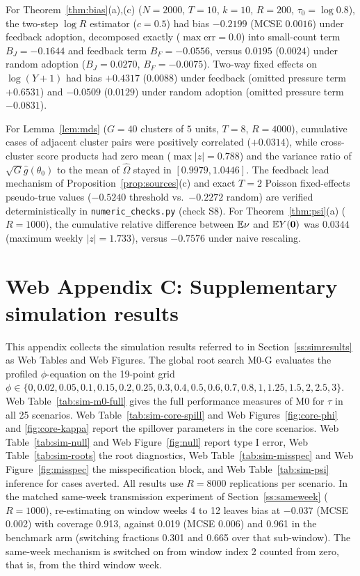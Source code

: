 For Theorem~\ref{thm:bias}(a),(c) ($N=2000$, $T=10$, $k=10$, $R=200$, $\tau_0=\log0.8$), the two-step $\log R$ estimator ($c=0.5$)
had bias $-0.2199$ (MCSE $0.0016$) under feedback adoption, decomposed exactly ($\max\text{err}=0.0$) into small-count term
$B_J=-0.1644$ and feedback term $B_F=-0.0556$, versus $0.0195$ ($0.0024$) under random adoption ($B_J=0.0270$, $B_F=-0.0075$).
Two-way fixed effects on $\log(Y+1)$ had bias $+0.4317$ ($0.0088$) under feedback (omitted pressure term $+0.6531$) and
$-0.0509$ ($0.0129$) under random adoption (omitted pressure term $-0.0831$).

For Lemma~\ref{lem:mds} ($G=40$ clusters of $5$ units, $T=8$, $R=4000$), cumulative cases of adjacent cluster pairs
were positively correlated ($+0.0314$), while cross-cluster score products had zero mean ($\max |z|=0.788$) and
the variance ratio of $\sqrt{G}\hat g(\theta_0)$ to the mean of $\hat\Omega$ stayed in $[0.9979, 1.0446]$. The feedback
lead mechanism of Proposition~\ref{prop:sources}(c) and exact $T=2$ Poisson fixed-effects pseudo-true values ($-0.5240$ threshold vs.\
$-0.2272$ random) are verified deterministically in \texttt{numeric\_checks.py} (check S8). For Theorem~\ref{thm:psi}(a)
($R=1000$), the cumulative relative difference between $\mathbb{E}\nu$ and $\mathbb{E} Y(\mathbf 0)$ was $0.0344$ (maximum weekly $|z|=1.733$),
versus $-0.7576$ under naive rescaling.

\section*{Web Appendix C: Supplementary simulation results}
\label{app:supp}
\webfloats

This appendix collects the simulation results referred to in Section~\ref{ss:simresults} as Web
Tables and Web Figures. The global root search M0-G evaluates the profiled $\phi$-equation on the
19-point grid
$\phi\in\{0,0.02,0.05,0.1,0.15,0.2,0.25,0.3,0.4,0.5,0.6,0.7,0.8,1,1.25,1.5,2,2.5,3\}$.
Web Table~\ref{tab:sim-m0-full} gives the full performance measures of M0
for $\tau$ in all 25 scenarios. Web Table~\ref{tab:sim-core-spill} and Web
Figures~\ref{fig:core-phi} and \ref{fig:core-kappa} report the spillover parameters in the core
scenarios. Web Table~\ref{tab:sim-null} and Web Figure~\ref{fig:null} report type I error, Web
Table~\ref{tab:sim-roots} the root diagnostics, Web Table~\ref{tab:sim-misspec} and Web
Figure~\ref{fig:misspec} the misspecification block, and Web Table~\ref{tab:sim-psi} inference for
cases averted. All results use $R=8000$ replications per scenario. In the matched same-week
transmission experiment of Section~\ref{ss:sameweek} ($R=1000$), re-estimating on window weeks 4
to 12 leaves bias at $-0.037$ (MCSE 0.002) with coverage 0.913, against 0.019 (MCSE 0.006) and
0.961 in the benchmark arm (switching fractions 0.301 and 0.665 over that sub-window). The
same-week mechanism is switched on from window index 2 counted from zero, that is, from the third
window week.

